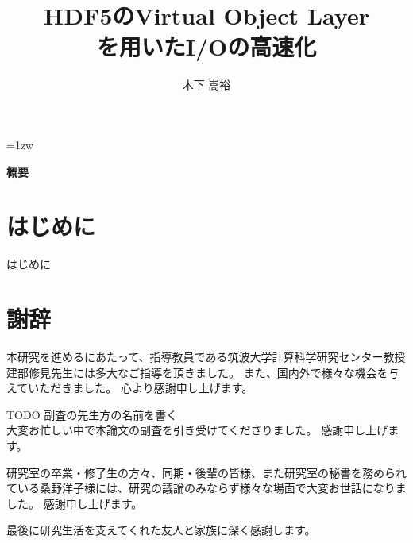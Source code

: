 \documentclass[a4paper,11pt]{jsreport}
\title{HDF5のVirtual Object Layer\\を用いたI/Oの高速化}
\author{木下 嵩裕}
\begin{document}
\maketitle
\thispagestyle{empty}
\newpage

\thispagestyle{empty}
\vspace*{20pt plus 1fil}
\parindent=1zw
\noindent
\begin{center}
{\bf 概要}
\vspace{5mm}
\end{center}

\par
\vspace{0pt plus 1fil}
\newpage

\tableofcontents
\listoffigures

\pagebreak \setcounter{page}{1}

\chapter{はじめに}

はじめに




\chapter*{謝辞}

本研究を進めるにあたって、指導教員である筑波大学計算科学研究センター教授 建部修見先生には多大なご指導を頂きました。
また、国内外で様々な機会を与えていただきました。
心より感謝申し上げます。

TODO 副査の先生方の名前を書く \\
大変お忙しい中で本論文の副査を引き受けてくださりました。
感謝申し上げます。

研究室の卒業・修了生の方々、同期・後輩の皆様、また研究室の秘書を務められている桑野洋子様には、研究の議論のみならず様々な場面で大変お世話になりました。
感謝申し上げます。

最後に研究生活を支えてくれた友人と家族に深く感謝します。

\newpage

\renewcommand{\bibname}{参考文献}



\end{document}
